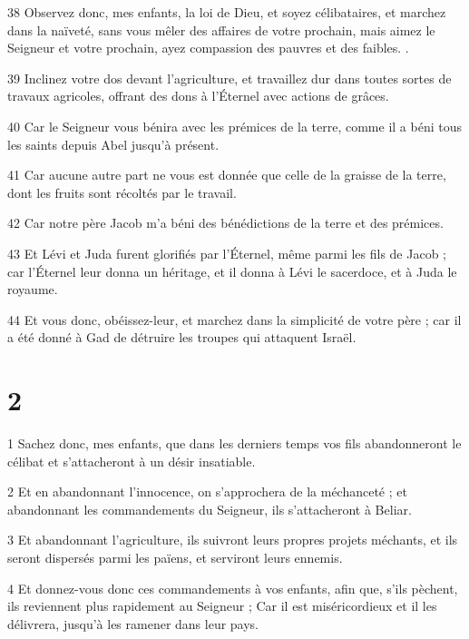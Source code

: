 \par 38 Observez donc, mes enfants, la loi de Dieu, et soyez célibataires, et marchez dans la naïveté, sans vous mêler des affaires de votre prochain, mais aimez le Seigneur et votre prochain, ayez compassion des pauvres et des faibles. .

\par 39 Inclinez votre dos devant l'agriculture, et travaillez dur dans toutes sortes de travaux agricoles, offrant des dons à l'Éternel avec actions de grâces.

\par 40 Car le Seigneur vous bénira avec les prémices de la terre, comme il a béni tous les saints depuis Abel jusqu'à présent.

\par 41 Car aucune autre part ne vous est donnée que celle de la graisse de la terre, dont les fruits sont récoltés par le travail.

\par 42 Car notre père Jacob m'a béni des bénédictions de la terre et des prémices.

\par 43 Et Lévi et Juda furent glorifiés par l'Éternel, même parmi les fils de Jacob ; car l'Éternel leur donna un héritage, et il donna à Lévi le sacerdoce, et à Juda le royaume.

\par 44 Et vous donc, obéissez-leur, et marchez dans la simplicité de votre père ; car il a été donné à Gad de détruire les troupes qui attaquent Israël.

\chapter{2}

\par 1 Sachez donc, mes enfants, que dans les derniers temps vos fils abandonneront le célibat et s'attacheront à un désir insatiable.

\par 2 Et en abandonnant l'innocence, on s'approchera de la méchanceté ; et abandonnant les commandements du Seigneur, ils s'attacheront à Beliar.

\par 3 Et abandonnant l'agriculture, ils suivront leurs propres projets méchants, et ils seront dispersés parmi les païens, et serviront leurs ennemis.

\par 4 Et donnez-vous donc ces commandements à vos enfants, afin que, s'ils pèchent, ils reviennent plus rapidement au Seigneur ; Car il est miséricordieux et il les délivrera, jusqu'à les ramener dans leur pays.

